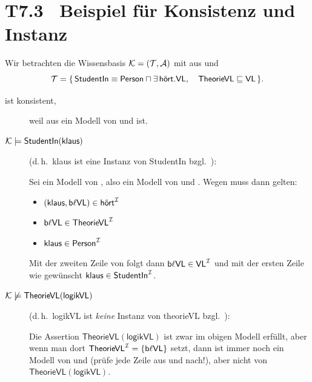 \documentclass[fontsize=11pt, twoside=false, numbers=autoenddot]{scrbook}
\begin{document}
\section*{T7.3~ Beispiel für Konsistenz und Instanz}

Wir betrachten die Wissensbasis $\mathcal{K} = (\mathcal{T},\mathcal{A})$
mit \Amc aus \textsf{\hyperlink{BspABox}{\BspABox}} und
\[
  \mathcal{T} = \{\, \textsf{StudentIn} \equiv \textsf{Person} \sqcap \exists\,\textsf{hört}.\textsf{VL}, \quad
  \textsf{TheorieVL} \sqsubseteq \textsf{VL} \,\}.
\]
\begin{description}
  \item[{\boldmath \Kmc ist konsistent,}]
    weil \Imc aus \textsf{\hyperlink{BspABoxModell}{\BspABoxModell}}
    ein Modell von \Tmc und \Amc ist.
  \item[{\boldmath $\mathcal{K} \models \textsf{StudentIn}(\textsf{klaus})$}]
    (d.\,h.\ \textsf{klaus} ist eine Instanz von \textsf{StudentIn} bzgl.\ \Kmc):
    
    Sei \Imc ein Modell von \Kmc, also ein Modell von \Amc und \Tmc.
    Wegen \Amc muss dann gelten:
    \begin{itemize}
      \item
        $(\textsf{klaus},\textsf{b$\ell$VL}) \in \textsf{hört}^\mathcal{I}$
      \item
        $\textsf{b$\ell$VL} \in \textsf{TheorieVL}^\mathcal{I}$
      \item
        $\textsf{klaus} \in \textsf{Person}^\mathcal{I}$
    \end{itemize}
    Mit der zweiten Zeile von \Tmc folgt dann $\textsf{b$\ell$VL} \in \textsf{VL}^\mathcal{I}$
    und mit der ersten Zeile wie gewünscht $\textsf{klaus} \in \textsf{StudentIn}^\mathcal{I}$.
  \item[{\boldmath $\mathcal{K} \not\models \textsf{TheorieVL}(\textsf{logikVL})$}]
    (d.\,h.\ \textsf{logikVL} ist \emph{keine} Instanz von \textsf{theorieVL} bzgl.\ \Kmc):
    
    Die Assertion $\textsf{TheorieVL}(\textsf{logikVL})$ ist zwar im obigen Modell \Imc erfüllt,
    aber wenn man dort $\textsf{TheorieVL}^\mathcal{I} = \{\textsf{b$\ell$VL}\}$ setzt,
    dann ist \Imc immer noch ein Modell von \Amc und \Tmc (prüfe jede Zeile aus
    \Amc und \Tmc nach!), aber nicht von $\textsf{TheorieVL}(\textsf{logikVL})$.
\end{description}
\end{document}
